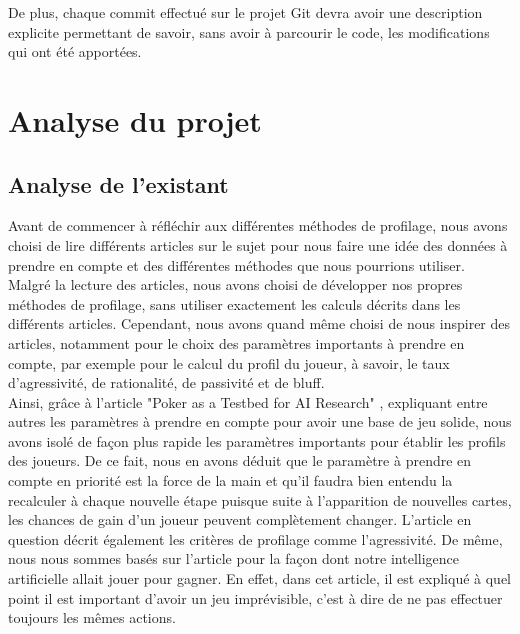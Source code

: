 \documentclass{report}
\begin{document}
De plus, chaque commit effectué sur le projet Git devra avoir une description explicite permettant de savoir, sans avoir à parcourir le code, les modifications qui ont été apportées.\par

\chapter{Analyse du projet}

\section{Analyse de l'existant}

\hspace{0.5cm}Avant de commencer à réfléchir aux différentes méthodes de profilage, nous avons choisi de lire différents articles sur le sujet pour nous faire une idée des données à prendre en compte et des différentes méthodes que nous pourrions utiliser. \\

Malgré la lecture des articles, nous avons choisi de développer nos propres méthodes de profilage, sans utiliser exactement les calculs décrits dans les différents articles. Cependant, nous avons quand même choisi de nous inspirer des articles, notamment pour le choix des paramètres importants à prendre en compte, par exemple pour le calcul du profil du joueur, à savoir, le taux d'agressivité, de rationalité, de passivité et de bluff. \\

Ainsi, grâce à l'article "Poker as a Testbed for AI Research" \cite{PokerAsATestbedForaIResearch}, expliquant entre autres les paramètres à prendre en compte pour avoir une base de jeu solide, nous avons isolé de façon plus rapide les paramètres importants pour établir les profils des joueurs. De ce fait, nous en avons déduit que le paramètre à prendre en compte en priorité est la force de la main et qu'il faudra bien entendu la recalculer à chaque nouvelle étape puisque suite à l'apparition de nouvelles cartes, les chances de gain d'un joueur peuvent complètement changer. L'article en question décrit également les critères de profilage comme l'agressivité. De même, nous nous sommes basés sur l'article pour la façon dont notre intelligence artificielle allait jouer pour gagner. En effet, dans cet article, il est expliqué à quel point il est important d'avoir un jeu imprévisible, c'est à dire de ne pas effectuer toujours les mêmes actions. \\
\end{document}

